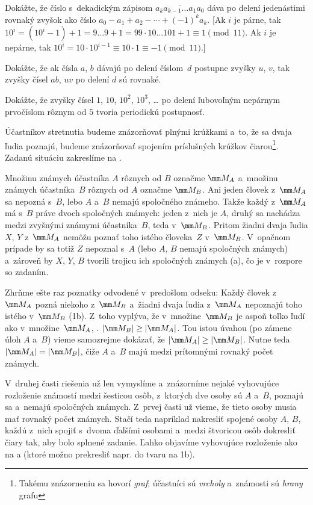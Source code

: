 {Dokážte, že číslo s~dekadickým zápisom $\overline{a_ka_{k-1}\dots a_1a_0}$ dáva po delení jedenástimi rovnaký zvyšok ako číslo $a_0-a_1+a_2-\cdots+(-1)^ka_k$. [Ak $i$ je párne, tak $10^i=(10^i-1)+1=9\dots9+1=99\cdot10\dots101+1\equiv1\pmod{11}$. Ak $i$ je nepárne, tak $10^i=10\cdot10^{i-1}\equiv10\cdot1\equiv-1\pmod{11}$.]

\D
Dokážte, že ak čísla $a$, $b$ dávajú po delení číslom~$d$ postupne zvyšky $u$, $v$, tak zvyšky čísel $ab$, $uv$ po delení $d$ sú rovnaké.

Dokážte, že zvyšky čísel $1$, $10$, $10^2$, $10^3$, \dots{} po delení ľubovoľným nepárnym prvočíslom rôznym od $5$ tvoria periodickú postupnosť.
}

{%
Účastníkov stretnutia budeme znázorňovať plnými krúžkami a~to, že sa dvaja ľudia poznajú, budeme znázorňovať spojením príslušných krúžkov čiarou\footnote{Takému znázorneniu sa hovorí {\it graf}; účastníci sú {\it vrcholy\/} a~známosti sú {\it hrany\/} grafu}. Zadanú situáciu zakreslíme na \obr.
%

Množinu známych účastníka $A$ rôznych od $B$ označme $\mm M_A$ a~množinu známych účastníka~$B$ rôznych od $A$ označme $\mm M_B$.
Ani jeden človek z~$\mm M_A$ sa nepozná s~$B$, lebo $A$ a~$B$ nemajú spoločného známeho. Takže každý z~$\mm M_A$ má s~$B$ práve dvoch spoločných známych: jeden z~nich je $A$, druhý sa nachádza medzi zvyšnými známymi účastníka~$B$, teda v~$\mm M_B$.
Pritom žiadni dvaja ľudia $X$, $Y$ z~$\mm M_A$ nemôžu poznať toho istého človeka~$Z$ v~$\mm M_B$. V~opačnom prípade by sa totiž $Z$ nepoznal s~$A$ (lebo $A$, $B$ nemajú spoločných známych) a~zároveň by $X$, $Y$, $B$ tvorili trojicu ich spoločných známych (\obr{}a), čo je v~rozpore so zadaním.
%

Zhrňme ešte raz poznatky odvodené v~predošlom odseku: Každý človek z~$\mm M_A$ pozná niekoho z~$\mm M_B$ a~žiadni dvaja ľudia z~$\mm M_A$ nepoznajú toho istého v~$\mm M_B$ (\obrr1b). Z~toho vyplýva, že v~množine~$\mm M_B$ je aspoň toľko ľudí ako v~množine~$\mm M_A$, \tj. $|\mm M_B|\ge|\mm M_A|$. Tou istou úvahou (po zámene úloh $A$ a~$B$) vieme samozrejme dokázať, že $|\mm M_A|\ge|\mm M_B|$. Nutne teda $|\mm M_A|=|\mm M_B|$, čiže $A$ a~$B$ majú medzi prítomnými rovnaký počet známych.

\smallskip
V~druhej časti riešenia už len vymyslíme a~znázorníme nejaké vyhovujúce rozloženie známostí medzi šesticou osôb, z~ktorých dve osoby sú $A$ a~$B$, poznajú sa a~nemajú spoločných známych. Z~prvej časti už vieme, že tieto osoby musia mať rovnaký počet známych. Stačí teda napríklad nakresliť spojené osoby $A$, $B$, každú z~nich spojiť s~dvoma ďalšími osobami a~medzi štvoricou osôb dokresliť čiary tak, aby bolo splnené zadanie. Ľahko objavíme vyhovujúce rozloženie ako na \obr{}a (ktoré možno prekresliť napr. do tvaru na \obrr1b).
%

}
